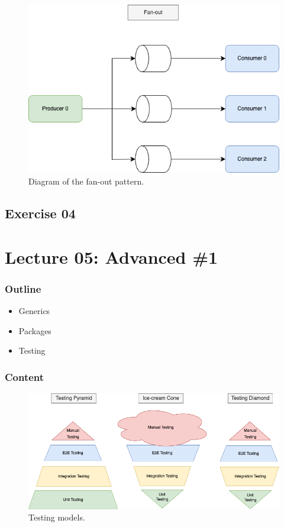 \documentclass[
  digital,
  color,
  oneside,
  nosansbold,
  nocolorbold,
  lof,
  nolot,
]{fithesis4}
\begin{document}
\begin{figure}[H]
    \centering
    \includegraphics[width=12cm]{figures/fanout.png}
    \caption{Diagram of the fan-out pattern.}
\end{figure}

\subsection{Exercise 04}

\section{Lecture 05: Advanced \#1}

\subsubsection{Outline}

\begin{itemize}
    \item Generics
    \item Packages
    \item Testing
\end{itemize}

\subsubsection{Content}

\begin{figure}[H]
    \centering
    \includegraphics[width=12cm]{figures/pyramids.png}
    \caption{Testing models.}
\end{figure}
\end{document}
